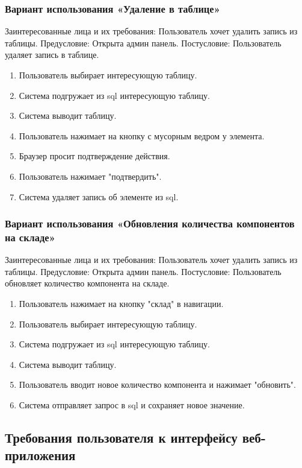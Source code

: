 \subsubsection{Вариант использования «Удаление в таблице»}
Заинтересованные лица и их требования: Пользователь хочет удалить запись из таблицы.
Предусловие: Открыта админ панель.
Постусловие: Пользователь удаляет запись в таблице.
\begin{enumerate}
	\item Пользователь выбирает интересующую таблицу.
	\item Система подгружает из sql интересующую таблицу.
	\item Система выводит таблицу.
	\item Пользователь нажимает на кнопку с мусорным ведром у элемента.
	\item Браузер просит подтверждение действия.
	\item Пользователь нажимает "подтвердить".
	\item Система удаляет запись об элементе из sql.
\end{enumerate}

\subsubsection{Вариант использования «Обновления количества компонентов на складе»}
Заинтересованные лица и их требования: Пользователь хочет удалить запись из таблицы.
Предусловие: Открыта админ панель.
Постусловие: Пользователь обновляет количество компонента на складе.
\begin{enumerate}
	\item Пользователь нажимает на кнопку "склад" в навигации.
	\item Пользователь выбирает интересующую таблицу.
	\item Система подгружает из sql интересующую таблицу.
	\item Система выводит таблицу.
	\item Пользователь вводит новое количество компонента и нажимает "обновить".
	\item Система отправляет запрос в sql и сохраняет новое значение.
\end{enumerate}

\subsection{Требования пользователя к интерфейсу веб-приложения}

